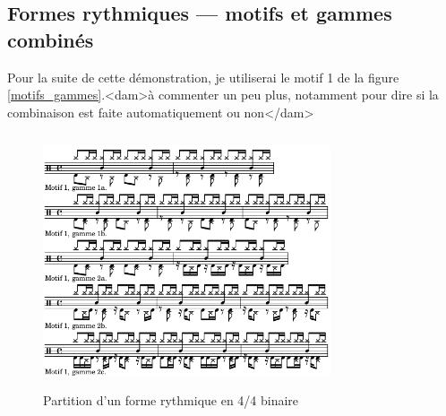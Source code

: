 \subsection*{Formes rythmiques — motifs et gammes combinés}
Pour la suite de cette démonstration, je utiliserai le motif 1 de la
figure \ref{motifs_gammes}.<dam>à commenter un peu plus, notamment pour dire si
la combinaison est faite automatiquement ou non</dam> 
\begin{figure}[h]
\centering
\includegraphics[height=75mm, width=85mm]{
z_images/4_experimentations/2_reecriture_guidee/2_systeme_4-4_binaire.png}
\caption{Partition d’un forme rythmique en 4/4 binaire}
\label{sys_binaire}
\end{figure}
